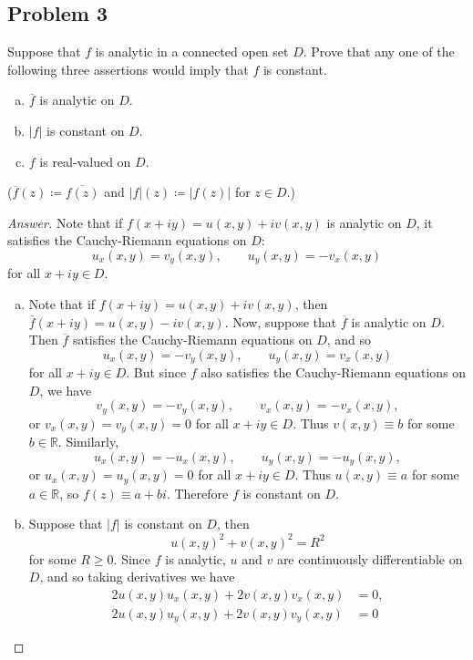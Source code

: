 \documentclass[12pt]{article}
\newcommand{\real}{\mathbb{R}}
\theoremstyle{definition}
\begin{document}
\subsection{Problem 3}
Suppose that $f$ is analytic in a connected open set $D$. Prove that any one of the following three assertions would imply that $f$ is constant.
\begin{enumerate}[(a)]
    \item $\overline{f}$ is analytic on $D$.
    \item $|f|$ is constant on $D$.
    \item $f$ is real-valued on $D$.
\end{enumerate}
($\overline{f}(z) \coloneqq \overline{f(z)}$ and $|f|(z) \coloneqq |f(z)|$ for $z \in D$.)
\begin{proof}[Answer]
    Note that if $f(x+iy) = u(x,y) + iv(x,y)$ is analytic on $D$, it satisfies the Cauchy-Riemann equations on $D$:
    \[
        u_x(x,y) = v_y(x,y) , \qquad u_y(x,y) = -v_x(x,y)
    \]
    for all $x+iy \in D$.
    \begin{enumerate}[(a)]
        \item Note that if $f(x+iy) = u(x,y) + iv(x,y)$, then $\overline{f}(x+iy) = u(x,y) -iv(x,y)$. Now, suppose that $\overline{f}$ is analytic on $D$. Then $\overline{f}$ satisfies the Cauchy-Riemann equations on $D$, and so 
        \[
            u_x(x,y) = -v_y(x,y) , \qquad u_y(x,y) = v_x(x,y)
        \]
        for all $x+iy \in D$. But since $f$ also satisfies the Cauchy-Riemann equations on $D$, we have 
        \[
            v_y(x,y) = -v_y(x,y) , \qquad v_x(x,y) = -v_x(x,y),
        \]
        or $v_x(x,y) = v_y(x,y) = 0$ for all $x+iy \in D$. Thus $v(x,y) \equiv b$ for some $b \in \real$. Similarly, 
        \[
            u_x(x,y) = -u_x(x,y) , \qquad u_y(x,y) = -u_y(x,y),
        \]
        or $u_x(x,y) = u_y(x,y) = 0$ for all $x+iy \in D$. Thus $u(x,y) \equiv a$ for some $a \in \real$, so $f(z) \equiv a + bi$. Therefore $f$ is constant on $D$.
        \item Suppose that $|f|$ is constant on $D$, then 
        \[
            u(x,y)^2 + v(x,y)^2 = R^2
        \]
        for some $R \geq 0$. Since $f$ is analytic, $u$ and $v$ are continuously differentiable on $D$, and so taking derivatives we have
        \begin{align*}
            2u(x,y) u_x(x,y) + 2v(x,y) v_x(x,y) & = 0, \\
            2u(x,y) u_y(x,y) + 2v(x,y) v_y(x,y) & = 0
        \end{align*}

\end{enumerate}
\end{proof}
\end{document}
